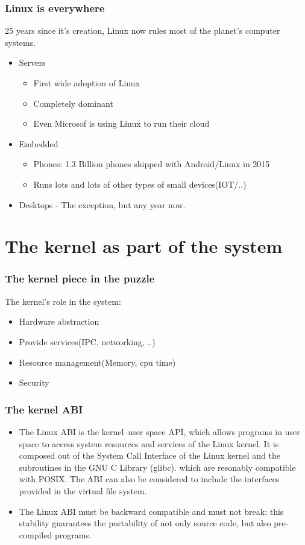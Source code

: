 \documentclass{beamer}
\begin{document}
\begin{frame}
\frametitle{Linux is everywhere}
25 years since it's creation, Linux now rules most of the planet's computer systems. \\
\begin{itemize}
	\item Servers
	\begin{itemize}
		\item First wide adoption of Linux
		\item Completely dominant
		\item Even Microsof is using Linux to run their cloud
	\end{itemize}
	\item Embedded 
	\begin{itemize}
		\item Phones: 1.3 Billion phones shipped with Android/Linux in 2015
		\item Runs lots and lots of other types of small devices(IOT/..)
	\end{itemize}
	\item Desktops - The exception, but any year now. 
\end{itemize}

\end{frame}

\section{The kernel as part of the system}

\begin{frame}
\frametitle{The kernel piece in the puzzle}
The kernel's role in the system: \\
\begin{itemize}
	\item Hardware abstraction
	\item Provide services(IPC, networking, ..)
	\item Resource management(Memory, cpu time)
	\item Security
\end{itemize}
\end{frame}

\begin{frame}
\frametitle{The kernel ABI}
\begin{itemize}
	\item The Linux ABI is the kernel–user space API, which allows programs in user space to access system resources and services of the Linux kernel. It is composed out of the System Call Interface of the Linux kernel and the subroutines in the GNU C Library (glibc). which are resonably compatible with POSIX. 
The ABI can also be considered to include the interfaces provided in the virtual file system. 

	\item The Linux ABI must be backward compatible and must not break; this stability guarantees the portability of not only source code, but also pre-compiled programs. 
\end{itemize}
\end{frame}
\end{document}
